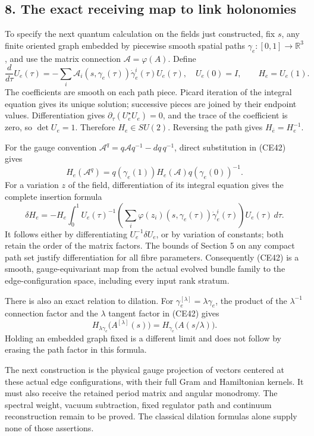 \documentclass[11pt]{article}
\begin{document}
\subsection*{8. The exact receiving map to link holonomies}

To specify the next quantum calculation on the fields just constructed,
fix \(s\), any finite oriented graph embedded by piecewise smooth
spatial paths \(\gamma_e:[0,1]\to\mathbb R^3\), and use the matrix
connection \(\mathcal A=\varphi(A)\). Define
\[
 \frac{d}{d\tau}U_e(\tau)
 =-\sum_i\mathcal A_i(s,\gamma_e(\tau))\dot\gamma_e^i(\tau)U_e(\tau),
 \quad U_e(0)=I,\qquad H_e=U_e(1).
 \tag{CE42}
\]
The coefficients are smooth on each path piece. Picard iteration of
the integral equation gives its unique solution; successive pieces
are joined by their endpoint values. Differentiation gives
\(\partial_\tau(U_e^\star U_e)=0\), and the trace of the coefficient
is zero, so \(\det U_e=1\). Therefore \(H_e\in SU(2)\).
Reversing the path gives \(H_{\bar e}=H_e^{-1}\).

For the gauge convention
\(\mathcal A^q=q\mathcal A q^{-1}-dq\,q^{-1}\), direct substitution
in (CE42) gives
\[
 H_e(\mathcal A^q)
   =q(\gamma_e(1))H_e(\mathcal A)q(\gamma_e(0))^{-1}.
 \tag{CE43}
\]
For a variation \(z\) of the field, differentiation of its integral
equation gives the complete insertion formula
\[
 \delta H_e
 =-H_e\int_0^1 U_e(\tau)^{-1}
       \left(\sum_i\varphi(z_i)(s,\gamma_e(\tau))
                          \dot\gamma_e^i(\tau)\right)
       U_e(\tau)\,d\tau.
 \tag{CE44}
\]
It follows either by differentiating \(U_e^{-1}\delta U_e\), or by
variation of constants; both retain the order of the matrix factors.
The bounds of Section 5 on any compact path set justify differentiation
for all fibre parameters. Consequently (CE42) is a smooth,
gauge-equivariant map from the actual evolved bundle family to the
edge-configuration space, including every input rank stratum.

There is also an exact relation to dilation. For
\(\gamma_e^{[\lambda]}=\lambda\gamma_e\), the product of the
\(\lambda^{-1}\) connection factor and the \(\lambda\) tangent factor
in (CE42) gives
\[
 H_{\lambda\gamma_e}\bigl(A^{[\lambda]}(s)\bigr)
        =H_{\gamma_e}\bigl(A(s/\lambda)\bigr).
 \tag{CE45}
\]
Holding an embedded graph fixed is a different limit and does not
follow by erasing the path factor in this formula.

The next construction is the physical gauge projection of vectors
centered at these actual edge configurations, with their full Gram
and Hamiltonian kernels. It must also receive the retained period
matrix and angular monodromy. The spectral weight, vacuum subtraction,
fixed regulator path and continuum reconstruction remain to be proved.
The classical dilation formulas alone supply none of those assertions.
\end{document}
